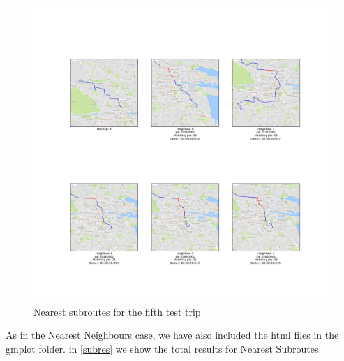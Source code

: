 \documentclass[12pt]{article}
\begin{document}
	\begin{figure} [H]
		\begin{center}
			\includegraphics [scale = 0.40] {subroutes5.jpg}
			\caption{Nearest subroutes for the fifth test trip}
		\end{center}
	\end{figure}

	As in the Nearest Neighbours case, we have also included the html files in the gmplot folder. in \ref{subres} we show the total results for Nearest Subroutes.
	
\end{document}
